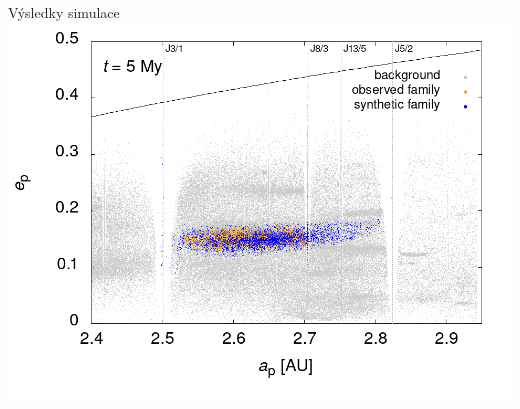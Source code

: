 \documentclass[xcolor=dvipsnames]{beamer}
\begin{document}
\begin{frame}[t]{\secname}{Výsledky simulace}
\centering
\includegraphics[width=0.8\paperwidth]{../obr/ae_5_trans.png}
\end{frame}
\end{document}
